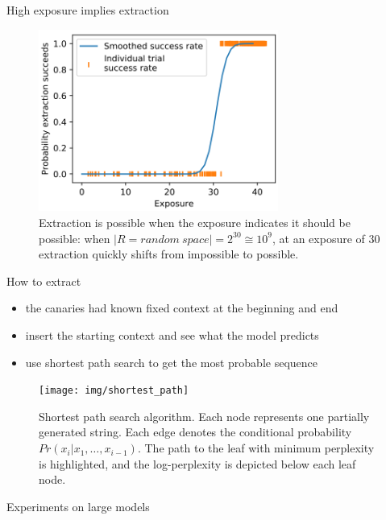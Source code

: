 \documentclass{beamer}
\begin{document}
\begin{frame}{High exposure implies extraction}

\begin{figure}[h]
\includegraphics[width=0.7\textwidth]{img/extraction}
\caption{Extraction is possible when the exposure indicates it should be possible: when $|R=random\ space| = 2^{30} \cong 10^9$, at an exposure of 30 extraction quickly shifts from impossible to possible.}
\end{figure}

\end{frame}
\begin{frame}{How to extract}

\begin{itemize}
\item the canaries had known fixed context at the beginning and end
\item insert the starting context and see what the model predicts
\item use shortest path search to get the most probable sequence

\end{itemize}

\begin{figure}[h]
\texttt{[image: img/shortest\_path]}
\caption{Shortest path search algorithm. Each node represents one partially generated string. Each edge denotes the conditional probability $Pr(x_i|x_1, \ldots, x_{i-1})$. The path to the leaf with minimum perplexity is highlighted, and the log-perplexity is depicted below each leaf node.}
\end{figure}


\end{frame}
\begin{frame}{Experiments on large models}

\end{frame}
\end{document}
